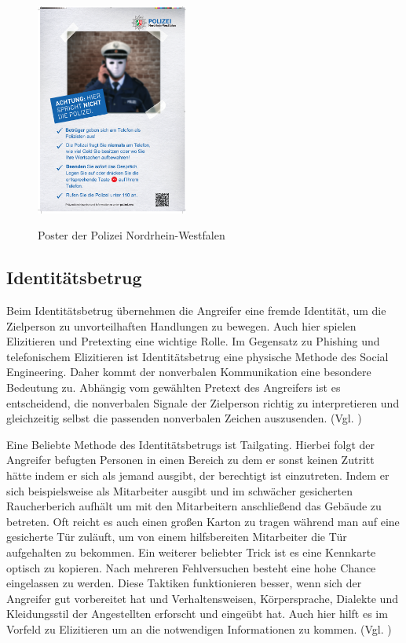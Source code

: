 \begin{figure}[h]
    \centering
\includegraphics[width = 5cm]{figures/LKA-Dokument-Poster-Falsche-Polizei NEU.pdf}
\caption{Poster der Polizei Nordrhein-Westfalen}
\cite{polizeibeamte}
\label{fig:Polizei}
\end{figure}

\subsection{Identitätsbetrug}

Beim Identitätsbetrug übernehmen die Angreifer eine fremde Identität, um die Zielperson zu unvorteilhaften Handlungen zu bewegen. Auch hier spielen Elizitieren und Pretexting eine wichtige Rolle. Im Gegensatz zu Phishing und telefonischem Elizitieren ist Identitätsbetrug eine physische Methode des Social Engineering. Daher kommt der nonverbalen Kommunikation eine besondere Bedeutung zu. Abhängig vom gewählten Pretext des Angreifers ist es entscheidend, die nonverbalen Signale der Zielperson richtig zu interpretieren und gleichzeitig selbst die passenden nonverbalen Zeichen auszusenden. (Vgl. \cite{Identitätsbetrug})

Eine Beliebte Methode des Identitätsbetrugs ist \glqq Tailgating\grqq{}. Hierbei folgt der Angreifer befugten Personen in einen Bereich zu dem er sonst keinen Zutritt hätte indem er sich als jemand ausgibt, der berechtigt ist einzutreten. Indem er sich beispielsweise als Mitarbeiter ausgibt und im schwächer gesicherten Raucherberich aufhält um mit den Mitarbeitern anschließend das Gebäude zu betreten. Oft reicht es auch einen großen Karton zu tragen während man auf eine gesicherte Tür zuläuft, um von einem hilfsbereiten Mitarbeiter die Tür aufgehalten zu bekommen. Ein weiterer beliebter Trick ist es eine Kennkarte optisch zu kopieren. Nach mehreren Fehlversuchen besteht eine hohe Chance eingelassen zu werden. Diese Taktiken funktionieren besser, wenn sich der Angreifer gut vorbereitet hat und Verhaltensweisen, Körpersprache, Dialekte und Kleidungsstil der Angestellten erforscht und eingeübt hat. Auch hier hilft es im Vorfeld zu Elizitieren um an die notwendigen Informationen zu kommen. (Vgl. \cite{Identitätsbetrug})

